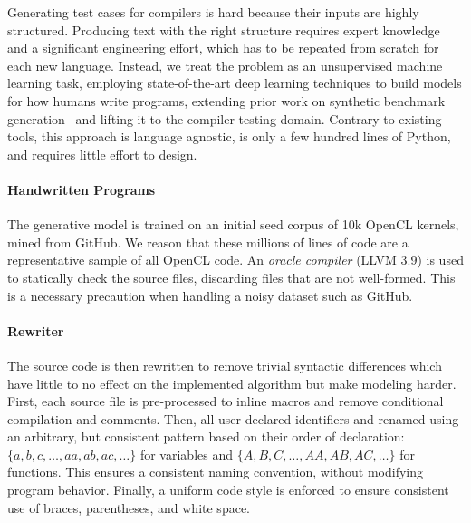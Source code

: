 Generating test cases for compilers is hard because their inputs are highly structured. Producing text with the right structure requires expert knowledge and a significant engineering effort, which has to be repeated from scratch for each new language. Instead, we treat the problem as an unsupervised machine learning task, employing state-of-the-art deep learning techniques to build models for how humans write programs, extending prior work on synthetic benchmark generation~\cite{Cummins2017a} and lifting it to the compiler testing domain. Contrary to existing tools, this approach is language agnostic, is only a few hundred lines of Python, and requires little effort to design.


\paragraph{Handwritten Programs} The generative model is trained on an initial seed corpus of 10k OpenCL kernels, mined from GitHub. We reason that these millions of lines of code are a representative sample of all OpenCL code. An \emph{oracle compiler} (LLVM 3.9) is used to statically check the source files, discarding files that are not well-formed. This is a necessary precaution when handling a noisy dataset such as GitHub.

\paragraph{Rewriter} The source code is then rewritten to remove trivial syntactic differences which have little to no effect on the implemented algorithm but make modeling harder. First, each source file is pre-processed to inline macros and remove conditional compilation and comments. Then, all user-declared identifiers and renamed using an arbitrary, but consistent pattern based on their order of declaration: $\{a,\allowbreak b,\allowbreak c,\allowbreak \ldots,\allowbreak aa,\allowbreak ab,\allowbreak ac,\allowbreak \ldots\}$ for variables and $\{A,\allowbreak B,\allowbreak C,\allowbreak \ldots,\allowbreak AA,\allowbreak AB,\allowbreak AC,\allowbreak \ldots\}$ for functions. This ensures a consistent naming convention, without modifying program behavior. Finally, a uniform code style is enforced to ensure consistent use of braces, parentheses, and white space.

